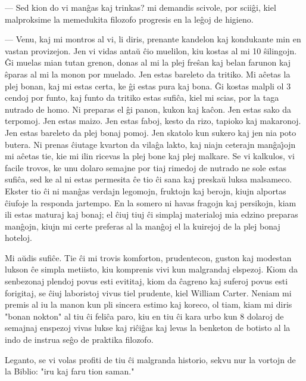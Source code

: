  --- Sed kion do vi man\^gas kaj trinkas? mi demandis scivole, por
scii\^gi, kiel malproksime la memedukita filozofo progresis en la
le\^goj de higieno.

 --- Venu, kaj mi montros al vi, li diris, prenante kandelon kaj
kondukante min en vastan provizejon. Jen vi vidas anta\u u \^cio
muelilon, kiu kostas al mi 10 \^silingojn. \^Gi muelas mian tutan
grenon, donas al mi la plej fre\^san kaj belan farunon kaj \^sparas
al mi la monon por muelado. Jen estas bareleto da tritiko. Mi
a\^cetas la plej bonan, kaj mi estas certa, ke \^gi estas pura kaj
bona. \^Gi kostas malpli ol 3 cendoj por funto, kaj funto da tritiko
estas sufi\^ca, kiel mi scias, por la taga nutrado de homo. Ni
preparas el \^gi panon, kukon kaj ka\^con. Jen estas sako da
terpomoj. Jen estas maizo. Jen estas faboj, kesto da rizo, tapioko
kaj makaronoj. Jen estas bareleto da plej bonaj pomoj. Jen skatolo
kun sukero kaj jen nia poto butera. Ni prenas \^ciutage kvarton da
vila\^ga lakto, kaj niajn ceterajn man\^ga\^{\j}ojn mi a\^cetas tie,
kie mi ilin ricevas la plej bone kaj plej malkare. Se vi kalkulos,
vi facile trovos, ke unu dolaro semajne por tiaj rimedoj de nutrado
ne sole estas sufi\^ca, sed ke al ni estas permesita \^ce tio \^ci
sana kaj preska\u u luksa malsameco. Ekster tio \^ci ni man\^gas
verdajn legomojn, fruktojn kaj berojn, kiujn alportas \^ciufoje la
responda jartempo. En la somero ni havas fragojn kaj persikojn, kiam
ili estas maturaj kaj bonaj; el \^ciuj tiuj \^ci simplaj materialoj
mia edzino preparas man\^gojn, kiujn mi certe preferas al la
man\^goj el la kuirejoj de la plej bonaj hoteloj.

   Mi a\u udis sufi\^ce. Tie \^ci mi trovis komforton, prudentecon, guston
kaj modestan lukson \^ce simpla metiisto, kiu komprenis vivi kun
malgrandaj elspezoj. Kiom da senbezonaj plendoj povus esti evititaj,
kiom da \^cagreno kaj suferoj povus esti forigitaj, se \^ciuj
laboristoj vivus tiel prudente, kiel William Carter. Neniam mi
premis al iu la manon kun pli sincera estimo kaj koreco, ol tiam,
kiam mi diris "bonan nokton" al tiu \^ci feli\^ca paro, kiu en tiu
\^ci kara urbo kun 8 dolaroj de semajnaj enspezoj vivas lukse kaj
ri\^ci\^gas kaj levas la benketon de botisto al la indo de instrua
se\^go de praktika filozofo.

   Leganto, se vi volas profiti de tiu \^ci malgranda historio, sekvu nur
la vortojn de la Biblio: "iru kaj faru tion saman."

\smallrule{}
